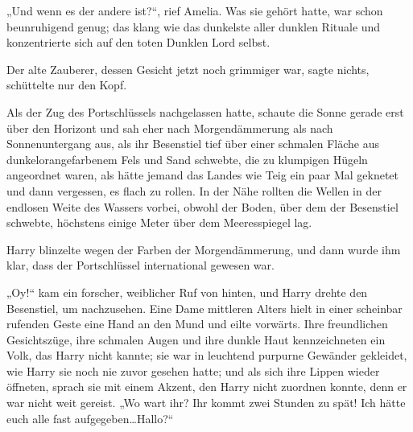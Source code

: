 „Und wenn es der andere ist?“, rief Amelia. Was sie gehört hatte, war schon beunruhigend genug; das klang wie das dunkelste aller dunklen Rituale und konzentrierte sich auf den toten Dunklen Lord selbst.

Der alte Zauberer, dessen Gesicht jetzt noch grimmiger war, sagte nichts, schüttelte nur den Kopf.

\later

Als der Zug des Portschlüssels nachgelassen hatte, schaute die Sonne gerade erst über den Horizont und sah eher nach Morgendämmerung als nach Sonnenuntergang aus, als ihr Besenstiel tief über einer schmalen Fläche aus dunkelorangefarbenem Fels und Sand schwebte, die zu klumpigen Hügeln angeordnet waren, als hätte jemand das Landes wie Teig ein paar Mal geknetet und dann vergessen, es flach zu rollen. In der Nähe rollten die Wellen in der endlosen Weite des Wassers vorbei, obwohl der Boden, über dem der Besenstiel schwebte, höchstens einige Meter über dem Meeresspiegel lag.

Harry blinzelte wegen der Farben der Morgendämmerung, und dann wurde ihm klar, dass der Portschlüssel international gewesen war.

„Oy!“ kam ein forscher, weiblicher Ruf von hinten, und Harry drehte den Besenstiel, um nachzusehen. Eine Dame mittleren Alters hielt in einer scheinbar rufenden Geste eine Hand an den Mund und eilte vorwärts. Ihre freundlichen Gesichtszüge, ihre schmalen Augen und ihre dunkle Haut kennzeichneten ein Volk, das Harry nicht kannte; sie war in leuchtend purpurne Gewänder gekleidet, wie Harry sie noch nie zuvor gesehen hatte; und als sich ihre Lippen wieder öffneten, sprach sie mit einem Akzent, den Harry nicht zuordnen konnte, denn er war nicht weit gereist. „Wo wart ihr? Ihr kommt zwei Stunden zu spät! Ich hätte euch alle fast aufgegeben…Hallo?“

